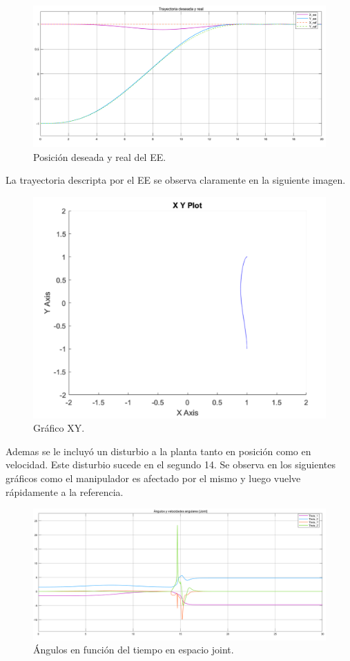 \begin{figure}[H]
	\centering
	\includegraphics[width=0.8\linewidth]{ImagenesControl de posición no lineal/1_3_b}
	\caption{Posición deseada y real del EE.}	
	\label{fig:apos}
\end{figure}
La trayectoria descripta por el EE se observa claramente en la siguiente imagen.
\begin{figure}[H]
	\centering
	\includegraphics[width=0.5\linewidth]{ImagenesControl de posición no lineal/1_3_c}
	\caption{Gráfico XY.}	
	\label{fig:axy}
\end{figure}

Ademas se le incluyó un disturbio a la planta tanto en posición como en velocidad. Este disturbio sucede en el segundo 14. Se observa en los siguientes gráficos como el manipulador es afectado por el mismo y luego vuelve rápidamente a la referencia.

\begin{figure}[H]
	\centering
	\includegraphics[width=0.8\linewidth]{ImagenesControl de posición no lineal/1_3_e_a}
	\caption{Ángulos en función del tiempo en espacio joint.}	
	\label{fig:athetasd}
\end{figure}

